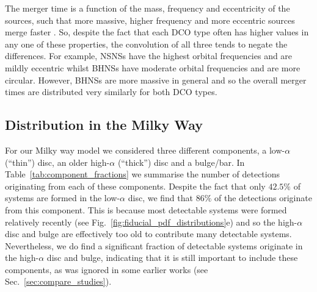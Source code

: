 The merger time is a function of the mass, frequency and eccentricity of the sources, such that more massive, higher frequency and more eccentric sources merge faster \citep[][Eq.~5.14]{Peters+1964}. So, despite the fact that each DCO type often has higher values in any one of these properties, the convolution of all three tends to negate the differences. For example, NSNSs have the highest orbital frequencies and are mildly eccentric whilst BHNSs have moderate orbital frequencies and are more circular. However, BHNSs are more massive in general and so the overall merger times are distributed very similarly for both DCO types.

\subsection{Distribution in the Milky Way}\label{sec:mw_detectable_distribution}
For our Milky way model we considered three different components, a low-$\alpha$ (``thin'') disc, an older high-$\alpha$ (``thick'') disc and a bulge/bar. In Table~\ref{tab:component_fractions} we summarise the number of detections originating from each of these components. Despite the fact that only $42.5\%$ of systems are formed in the low-$\alpha$ disc, we find that $86\%$ of the detections originate from this component. This is because most detectable systems were formed relatively recently (see Fig.~\ref{fig:fiducial_pdf_distributions}e) and so the high-$\alpha$ disc and bulge are effectively too old to contribute many detectable systems. Nevertheless, we do find a significant fraction of detectable systems originate in the high-$\alpha$ disc and bulge, indicating that it is still important to include these components, as was ignored in some earlier works (see Sec.~\ref{sec:compare_studies}).


